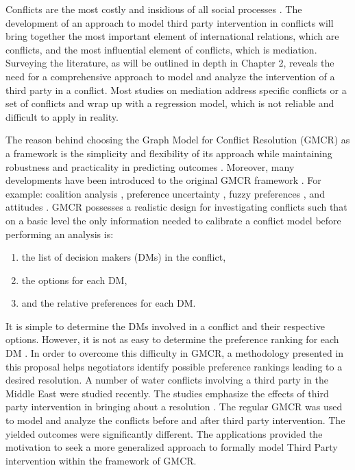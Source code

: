 \documentclass[letterpaper,12pt,titlepage,oneside,final]{book}
\begin{document}
Conflicts are the most costly and insidious of all social processes \citep{bercovitch2009}. The development of an approach to model third party intervention in conflicts will bring together the most important element of international relations, which are conflicts, and the most influential element of conflicts, which is mediation.
Surveying the literature, as will be outlined in depth in Chapter 2, reveals the need for a comprehensive approach to model and analyze the intervention of a third party in a conflict. Most studies on mediation address specific conflicts or a set of conflicts and wrap up with a regression model, which is not reliable and difficult to apply in reality.

The reason behind choosing the Graph Model for Conflict Resolution (GMCR) as a framework is the simplicity and flexibility of its approach while maintaining robustness and practicality in predicting outcomes \citep{Kilgour1987,Fang1989,fang1993,Inohara2011}. Moreover, many developments have been introduced to the original GMCR framework \citep{kilgour2005}. For example: coalition analysis \citep{inohara2008a,inohara2008b}, preference uncertainty \citep{li2004} , fuzzy preferences \citep{bashar2012fuzzy,hipel2011fuzzy} , and attitudes \citep{walker2008}. GMCR  possesses a realistic design for investigating conflicts such that on a basic level the only information needed to calibrate a conflict model before performing an analysis is:
\begin{enumerate}
\item the list of decision makers (DMs) in the conflict,
\item the options for each DM,
\item and the relative preferences for each DM.
\end{enumerate}
It is simple to determine the DMs involved in a conflict and their respective options. However, it is not as easy to determine the preference ranking for each DM \citep{kilgour1996negotiation}. In order to overcome this difficulty in GMCR, a methodology presented in this proposal helps negotiators identify possible preference rankings leading to a desired resolution. A number of water conflicts involving a third party in the Middle East were studied recently. The studies emphasize the effects of third party intervention in bringing about a resolution \citep{HipelRami}. The regular GMCR was used to model and analyze the conflicts before and after third party intervention. The yielded outcomes were significantly different. The applications provided the motivation to seek a more generalized approach to formally model Third Party intervention within the framework of GMCR.
\end{document}
